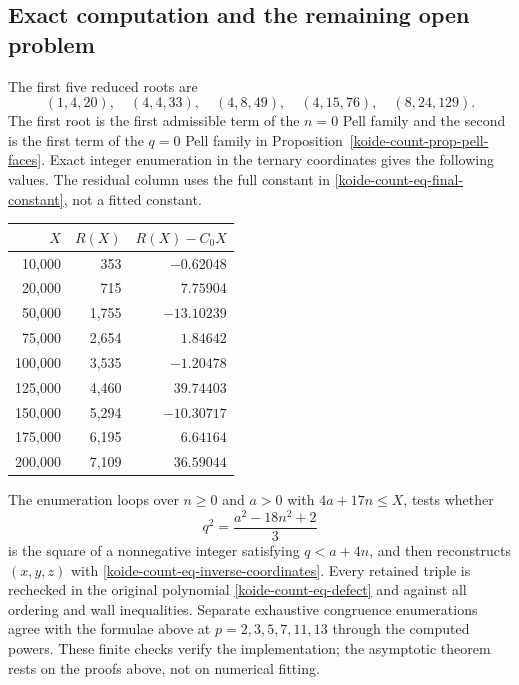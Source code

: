 \subsection{Exact computation and the remaining open problem}
\label{koide-count-subsec-computation}

The first five reduced roots are
\begin{equation}
 (1,4,20),\quad(4,4,33),\quad(4,8,49),\quad
 (4,15,76),\quad(8,24,129).
 \label{koide-count-eq-first-roots}
\end{equation}
The first root is the first admissible term of the $n=0$ Pell family and
the second is the first term of the $q=0$ Pell family in
Proposition~\ref{koide-count-prop-pell-faces}.
Exact integer enumeration in the ternary coordinates gives the following
values.  The residual column uses the full constant in
\eqref{koide-count-eq-final-constant}, not a fitted constant.
\begin{center}
\begin{tabular}{r@{\qquad}r@{\qquad}r}
\toprule
\(X\)&\(R(X)\)&\(R(X)-C_0X\)\\
\midrule
10,000&353&\(-0.62048\)\\
20,000&715&\(7.75904\)\\
50,000&1,755&\(-13.10239\)\\
75,000&2,654&\(1.84642\)\\
100,000&3,535&\(-1.20478\)\\
125,000&4,460&\(39.74403\)\\
150,000&5,294&\(-10.30717\)\\
175,000&6,195&\(6.64164\)\\
200,000&7,109&\(36.59044\)\\
\bottomrule
\end{tabular}
\end{center}
The enumeration loops over \(n\geq0\) and \(a>0\) with
\(4a+17n\leq X\), tests whether
\[
 q^2=\frac{a^2-18n^2+2}{3}
\]
is the square of a nonnegative integer satisfying \(q<a+4n\), and then
reconstructs \((x,y,z)\) with
\eqref{koide-count-eq-inverse-coordinates}.  Every retained triple is
rechecked in the original polynomial \eqref{koide-count-eq-defect} and
against all ordering and wall inequalities.  Separate exhaustive congruence
enumerations agree with the formulae above at
\(p=2,3,5,7,11,13\) through the computed powers.  These finite checks
verify the implementation; the asymptotic theorem rests on the proofs above,
not on numerical fitting.

